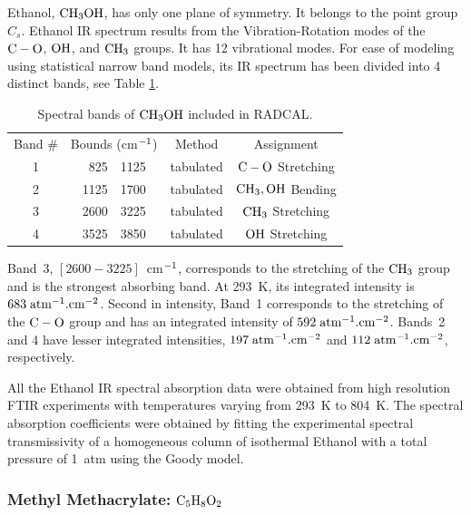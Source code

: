   Ethanol, $\rm CH_3OH$, has only one plane of symmetry. 
  It belongs to the point group $C_{s}$. 
  Ethanol IR spectrum results from the Vibration-Rotation
  modes of the $\rm C-O$, $\rm OH$, and $\rm CH_3$ groups. It has
  12 vibrational modes. For ease of modeling using 
  statistical narrow band models, its IR spectrum has
  been divided into 4 distinct bands, see Table \ref{Table::CH3OH}. 
  \begin{table}[ht] 
   \centering
   \caption{Spectral bands of $\rm CH_3OH$ included in RADCAL.}
   \vspace{0.1in}
   \label{Table::CH3OH}
   \begin{tabular}{|c|r@{-}l|c|c|} 
    \hline
    Band \# & \multicolumn{2}{|l|}{Bounds (cm$\rm ^{-1}$) } & Method & Assignment \\
    \cline{1-5}  
    1 & 825  & 1125 & tabulated & $\rm C-O$ Stretching   \\
    2 & 1125 & 1700 & tabulated & $\rm CH_3, OH$ Bending \\
    3 & 2600 & 3225 & tabulated & $\rm CH_3$ Stretching \\ 
    4 & 3525 & 3850 & tabulated & $\rm OH$ Stretching \\     
    \hline
   \end{tabular} 
  \end{table}
  Band~3, $\left[2600-3225\right]$~cm$\rm ^{-1}$, corresponds to the 
  stretching of the $\rm CH_3$ group and is the strongest 
  absorbing band. At 293~K, its integrated intensity is
  $683\;\rm {atm^{-1}.cm^{-2}}$. Second in intensity,
  Band~1 corresponds to the stretching of the $\rm C-O$ group and has 
  an integrated intensity of $592\;\rm {atm^{-1}.cm^{-2}}$.
  Bands~2 and 4 have lesser integrated intensities, $197\;\rm {atm^{-1}.cm^{-2}}$
  and $112\;\rm {atm^{-1}.cm^{-2}}$, respectively.
  
  All the Ethanol IR spectral absorption data were obtained from high resolution
  FTIR experiments with temperatures varying from 293~K to 804~K.
  The spectral absorption coefficients were obtained by fitting the experimental
  spectral transmissivity of a homogeneous column of isothermal Ethanol
  with a total pressure of 1~atm using the Goody model. 

\subsubsection{Methyl Methacrylate: $\rm C_5H_8O_2$}

